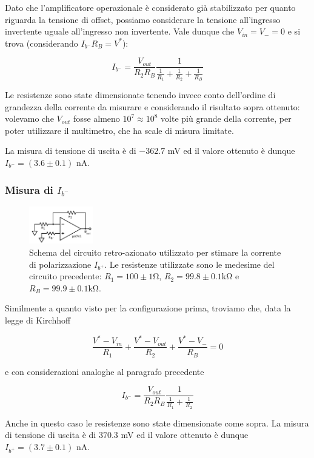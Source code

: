 Dato che l'amplificatore operazionale è considerato già stabilizzato per quanto riguarda la tensione di offset, possiamo considerare la tensione all'ingresso invertente uguale all'ingresso non invertente. Vale dunque che $V_{in}=V_{-}=0$ e si trova (considerando $I_{b^-} R_B = V^*$):

$$I_{b^-}=\frac{V_{out}}{R_2 R_B}\frac{1}{\frac{1}{R_1}+\frac{1}{R_2}+\frac{1}{R_B}}$$

Le resistenze sono state dimensionate tenendo invece conto dell'ordine di grandezza della corrente da misurare e considerando il risultato sopra ottenuto: volevamo che $V_{out}$ fosse almeno $10^7\approx10^8$ volte più grande della corrente, per poter utilizzare il multimetro, che ha scale di misura limitate.

La misura di tensione di uscita è di $-362.7$ \si{\milli\volt} ed il valore ottenuto è dunque $I_{b^-} = (3.6 \pm 0.1)$ \si{\nano\ampere}.

\subsubsection{Misura di $I_{b^-}$}

\begin{figure}
  \begin{center}
    \includegraphics[width=0.25\textwidth]{../E02/latex/ninv_current.pdf}
  \end{center}
  \caption{Schema del circuito retro-azionato utilizzato per stimare la corrente di polarizzazione $I_{b^+}$. Le resistenze utilizzate sono le medesime del circuito precedente: $R_1=100\pm1$\si{\ohm}, $R_2=99.8\pm0.1$\si{\kilo\ohm} e $R_B=99.9\pm0.1$\si{\kilo\ohm}.}
  \label{circuito:rel2_correnti_retroazione_inv}
\end{figure}

Similmente a quanto visto per la configurazione prima, troviamo che, data la legge di Kirchhoff

$$\frac{V^* - V_{in}}{R_1} + \frac{V^*-V_{out}}{R_2} + \frac{V^*-V_{-}}{R_B}=0$$

e con considerazioni analoghe al paragrafo precedente

$$I_{b^-}=\frac{V_{out}}{R_2 R_B}\frac{1}{\frac{1}{R_1}+\frac{1}{R_2}}$$

Anche in questo caso le resistenze sono state dimensionate come sopra. La misura di tensione di uscita è di $370.3$ \si{\milli\volt} ed il valore ottenuto è dunque $I_{b^+} = (3.7 \pm 0.1)$ \si{\nano\ampere}.